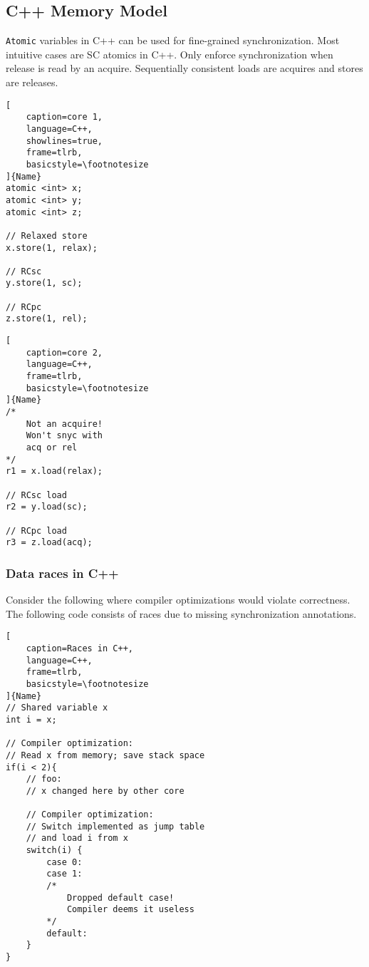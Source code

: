 \documentclass{article}
\begin{document}
\begin{multicols*}{2}
\subsection{C++ Memory Model}
\texttt{Atomic} variables in C++ can be used for fine-grained synchronization. Most intuitive cases are SC atomics in C++. Only enforce synchronization when release is read by an acquire. Sequentially consistent loads are acquires and stores are releases.

\noindent\begin{minipage}{.22\textwidth}
\captionsetup{labelformat=empty}
\begin{lstlisting}[
    caption=core 1,
    language=C++,
    showlines=true,
    frame=tlrb, 
    basicstyle=\footnotesize
]{Name}
atomic <int> x;
atomic <int> y;
atomic <int> z;

// Relaxed store
x.store(1, relax);

// RCsc
y.store(1, sc);

// RCpc
z.store(1, rel);
\end{lstlisting}
\end{minipage}\hfill
\begin{minipage}{.22\textwidth}
\captionsetup{labelformat=empty}
\begin{lstlisting}[
    caption=core 2,
    language=C++,
    frame=tlrb,
    basicstyle=\footnotesize
]{Name}
/*
    Not an acquire!
    Won't snyc with
    acq or rel
*/
r1 = x.load(relax);

// RCsc load
r2 = y.load(sc);

// RCpc load
r3 = z.load(acq);
\end{lstlisting}
\end{minipage}

\subsubsection{Data races in C++}
Consider the following where compiler optimizations would violate correctness. The following code consists of races due to missing synchronization annotations.
\begin{lstlisting}[
    caption=Races in C++,
    language=C++,
    frame=tlrb,
    basicstyle=\footnotesize
]{Name}
// Shared variable x
int i = x;

// Compiler optimization:
// Read x from memory; save stack space
if(i < 2){
    // foo:
    // x changed here by other core
    
    // Compiler optimization:
    // Switch implemented as jump table
    // and load i from x
    switch(i) {
        case 0:
        case 1:
        /*
            Dropped default case!
            Compiler deems it useless
        */
        default:
    }
}
\end{lstlisting}


\end{multicols*}
\end{document}
